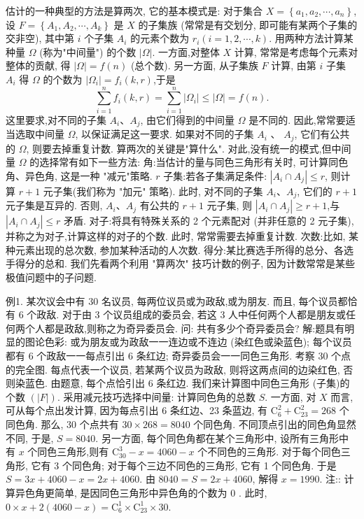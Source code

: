 
估计的一种典型的方法是算两次, 它的基本模式是:
对于集合 $X=\left\{a_1, a_2, \cdots, a_n\right\}$, 设 $F=\left\{A_1, A_2, \cdots, A_k\right\}$ 是 $X$ 的子集族 (常常是有交划分, 即可能有某两个子集的交非空), 其中第 $i$ 个子集 $A_i$ 的元素个数为 $r_i(i=1,2, \cdots, k)$.
用两种方法计算某种量 $\Omega$ (称为"中间量") 的个数 $|\Omega|$. 一方面,对整体 $X$ 计算, 常常是考虑每个元素对整体的贡献, 得 $|\Omega|=f(n)$ (总个数). 另一方面, 从子集族 $F$ 计算, 由第 $i$ 子集 $A_i$ 得 $\Omega$ 的个数为 $\left|\Omega_i\right|=f_i(k, r)$,于是
$$
\sum_{i=1}^n f_i(k, r)=\sum_{i=1}^n\left|\Omega_i\right| \leqslant|\Omega|=f(n) .
$$
这里要求,对不同的子集 $A_i 、 A_j$, 由它们得到的中间量 $\Omega$ 是不同的.
因此,常常要适当选取中间量 $\Omega$, 以保证满足这一要求.
如果对不同的子集 $A_i$ 、 $A_j$, 它们有公共的 $\Omega$, 则要去掉重复计数.
算两次的关键是"算什么". 对此,没有统一的模式,但中间量 $\Omega$ 的选择常有如下一些方法:
角:当估计的量与同色三角形有关时, 可计算同色角、异色角, 这是一种 "减元"策略.
$r$ 子集:若各子集满足条件: $\left|A_i \cap A_j\right| \leqslant r$, 则计算 $r+1$ 元子集(我们称为 "加元" 策略). 此时, 对不同的子集 $A_i 、 A_j$, 它们的 $r+1$ 元子集是互异的.
否则, $A_i 、 A_j$ 有公共的 $r+1$ 元子集, 则 $\left|A_i \cap A_j\right| \geqslant r+1$,与 $\left|A_i \cap A_j\right| \leqslant r$ 矛盾.
对子:将具有特殊关系的 2 个元素配对 (并非任意的 2 元子集), 并称之为对子,计算这样的对子的个数.
此时, 常常需要去掉重复计数.
次数:比如, 某种元素出现的总次数, 参加某种活动的人次数.
得分:某比赛选手所得的总分、各选手得分的总和.
我们先看两个利用 "算两次" 技巧计数的例子, 因为计数常常是某些极值问题中的子问题.



例1. 某次议会中有 30 名议员, 每两位议员或为政敌,或为朋友.
而且, 每个议员都恰有 6 个政敌.
对于由 3 个议员组成的委员会, 若这 3 人中任何两个人都是朋友或任何两个人都是政敌,则称之为奇异委员会.
问: 共有多少个奇异委员会?
解:题具有明显的图论色彩: 或为朋友或为政敌一一连边或不连边 (染红色或染蓝色); 每个议员都有 6 个政敌一一每点引出 6 条红边; 奇异委员会一一同色三角形.
考察 30 个点的完全图.
每点代表一个议员, 若某两个议员为政敌, 则将这两点间的边染红色, 否则染蓝色.
由题意, 每个点恰引出 6 条红边.
我们来计算图中同色三角形 (子集)的个数 $(|F|)$. 采用减元技巧选择中间量: 计算同色角的总数 $S$.
一方面, 对 $X$ 而言, 可从每个点出发计算, 因为每点引出 6 条红边、23 条蓝边, 有 $\mathrm{C}_6^2+\mathrm{C}_{23}^2=268$ 个同色角.
那么, 30 个点共有 $30 \times 268=8040$ 个同色角.
不同顶点引出的同色角显然不同, 于是, $S=8040$.
另一方面, 每个同色角都在某个三角形中, 设所有三角形中有 $x$ 个同色三角形,则有 $\mathrm{C}_{30}^3-x=4060-x$ 个不同色的三角形.
对于每个同色三角形, 它有 3 个同色角; 对于每个三边不同色的三角形, 它有 1 个同色角.
于是 $S=3 x+ 4060-x=2 x+4060$.
由 $8040=S=2 x+4060$, 解得 $x=1990$.
注:: 计算异色角更简单, 是因同色三角形中异色角的个数为 0 . 此时, $0 \times x+2(4060-x)=\mathrm{C}_6^1 \times \mathrm{C}_{23}^1 \times 30$.



